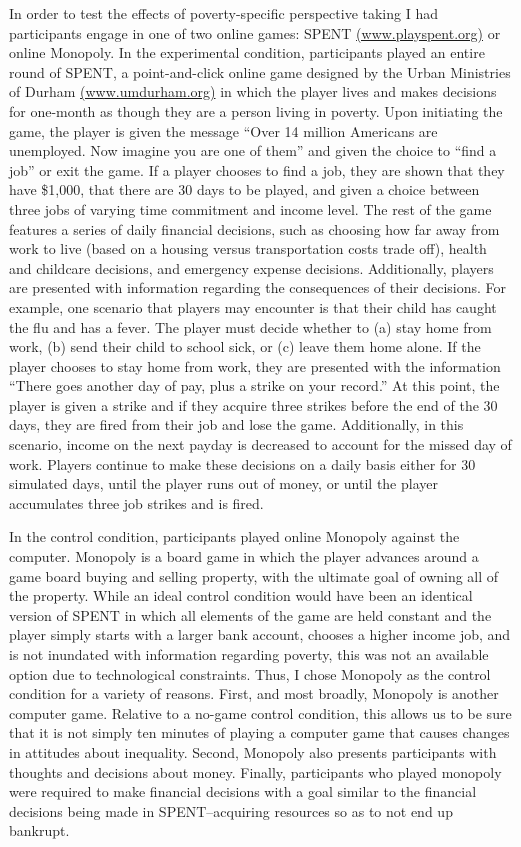 \documentclass{sfuthesis}
\begin{document}
In order to test the effects of poverty-specific perspective taking I had participants engage in one of two online games: SPENT \href{www.playspent.org}{(www.playspent.org)} or online Monopoly. In the experimental condition, participants played an entire round of SPENT, a point-and-click online game designed by the Urban Ministries of Durham \href{www.umdurham.org}{(www.umdurham.org)} in which the player lives and makes decisions for one-month as though they are a person living in poverty. Upon initiating the game, the player is given the message “Over 14 million Americans are unemployed. Now imagine you are one of them” and given the choice to “find a job” or exit the game. If a player chooses to find a job, they are shown that they have \$1,000, that there are 30 days to be played, and given a choice between three jobs of varying time commitment and income level. The rest of the game features a series of daily financial decisions, such as choosing how far away from work to live (based on a housing versus transportation costs trade off), health and childcare decisions, and emergency expense decisions. Additionally, players are presented with information regarding the consequences of their decisions. For example, one scenario that players may encounter is that their child has caught the flu and has a fever. The player must decide whether to (a) stay home from work, (b) send their child to school sick, or (c) leave them home alone. If the player chooses to stay home from work, they are presented with the information “There goes another day of pay, plus a strike on your record.” At this point, the player is given a strike and if they acquire three strikes before the end of the 30 days, they are fired from their job and lose the game. Additionally, in this scenario, income on the next payday is decreased to account for the missed day of work. Players continue to make these decisions on a daily basis either for 30 simulated days, until the player runs out of money, or until the player accumulates three job strikes and is fired. 

In the control condition, participants played online Monopoly against the computer. Monopoly is a board game in which the player advances around a game board buying and selling property, with the ultimate goal of owning all of the property. While an ideal control condition would have been an identical version of SPENT in which all elements of the game are held constant and the player simply starts with a larger bank account, chooses a higher income job, and is not inundated with information regarding poverty, this was not an available option due to technological constraints. Thus, I chose Monopoly as the control condition for a variety of reasons. First, and most broadly, Monopoly is another computer game. Relative to a no-game control condition, this allows us to be sure that it is not simply ten minutes of playing a computer game that causes changes in attitudes about inequality. Second, Monopoly also presents participants with thoughts and decisions about money. Finally, participants who played monopoly were required to make financial decisions with a goal similar to the financial decisions being made in SPENT--acquiring resources so as to not end up bankrupt.
\end{document}
